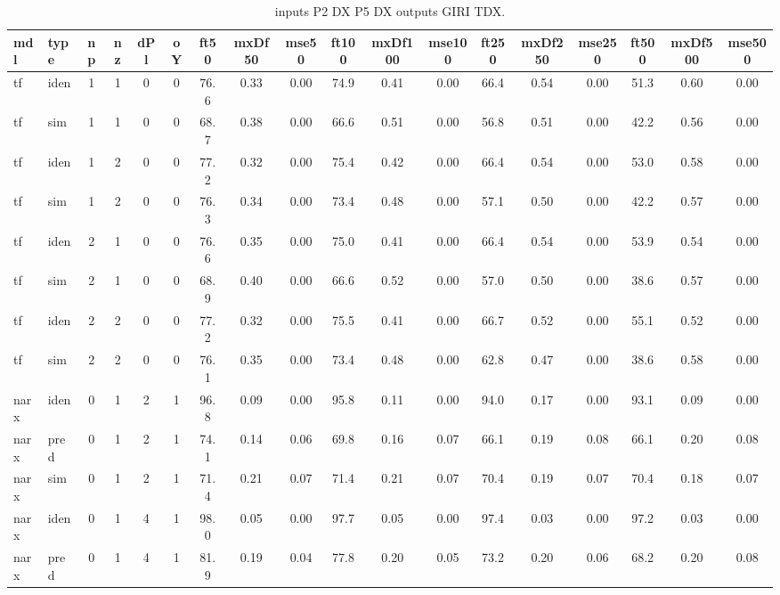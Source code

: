 \begin{landscape} 
 \begin{center} 
 \footnotesize 
 \begin{longtable}{ll|cccc|ccc|ccc|ccc|ccc} 
\caption[inputs P2 DX P5 DX   outputs GIRI TDX]{inputs P2 DX P5 DX   outputs GIRI TDX.} 
\label{tab:inputs_P2_DX_P5_DX___outputs_GIRI_TDX} 
\hline 
  mdl & type & np & nz & dPl & oY & ft50 & mxDf50 & mse50 & ft100 & mxDf100 & mse100 & ft250 & mxDf250 & mse250 & ft500 & mxDf500 & mse500 \\ 
 \hline 
tf  & iden & 1 & 1 & 0 & 0 & 76.6 & 0.33 & 0.00 & 74.9 & 0.41 & 0.00 & 66.4 & 0.54 & 0.00 & 51.3 & 0.60 & 0.00 \\ 
tf  & sim  & 1 & 1 & 0 & 0 & 68.7 & 0.38 & 0.00 & 66.6 & 0.51 & 0.00 & 56.8 & 0.51 & 0.00 & 42.2 & 0.56 & 0.00 \\ 
 \hline 
tf  & iden & 1 & 2 & 0 & 0 & 77.2 & 0.32 & 0.00 & 75.4 & 0.42 & 0.00 & 66.4 & 0.54 & 0.00 & 53.0 & 0.58 & 0.00 \\ 
tf  & sim  & 1 & 2 & 0 & 0 & 76.3 & 0.34 & 0.00 & 73.4 & 0.48 & 0.00 & 57.1 & 0.50 & 0.00 & 42.2 & 0.57 & 0.00 \\ 
 \hline 
tf  & iden & 2 & 1 & 0 & 0 & 76.6 & 0.35 & 0.00 & 75.0 & 0.41 & 0.00 & 66.4 & 0.54 & 0.00 & 53.9 & 0.54 & 0.00 \\ 
tf  & sim  & 2 & 1 & 0 & 0 & 68.9 & 0.40 & 0.00 & 66.6 & 0.52 & 0.00 & 57.0 & 0.50 & 0.00 & 38.6 & 0.57 & 0.00 \\ 
 \hline 
tf  & iden & 2 & 2 & 0 & 0 & 77.2 & 0.32 & 0.00 & 75.5 & 0.41 & 0.00 & 66.7 & 0.52 & 0.00 & 55.1 & 0.52 & 0.00 \\ 
tf  & sim  & 2 & 2 & 0 & 0 & 76.1 & 0.35 & 0.00 & 73.4 & 0.48 & 0.00 & 62.8 & 0.47 & 0.00 & 38.6 & 0.58 & 0.00 \\ 
 \hline 
narx & iden & 0 & 1 & 2 & 1 & 96.8 & 0.09 & 0.00 & 95.8 & 0.11 & 0.00 & 94.0 & 0.17 & 0.00 & 93.1 & 0.09 & 0.00 \\ 
narx & pred & 0 & 1 & 2 & 1 & 74.1 & 0.14 & 0.06 & 69.8 & 0.16 & 0.07 & 66.1 & 0.19 & 0.08 & 66.1 & 0.20 & 0.08 \\ 
narx & sim  & 0 & 1 & 2 & 1 & 71.4 & 0.21 & 0.07 & 71.4 & 0.21 & 0.07 & 70.4 & 0.19 & 0.07 & 70.4 & 0.18 & 0.07 \\ 
 \hline 
narx & iden & 0 & 1 & 4 & 1 & 98.0 & 0.05 & 0.00 & 97.7 & 0.05 & 0.00 & 97.4 & 0.03 & 0.00 & 97.2 & 0.03 & 0.00 \\ 
narx & pred & 0 & 1 & 4 & 1 & 81.9 & 0.19 & 0.04 & 77.8 & 0.20 & 0.05 & 73.2 & 0.20 & 0.06 & 68.2 & 0.20 & 0.08 \\ 

\end{longtable}
\end{center}
\end{landscape}
